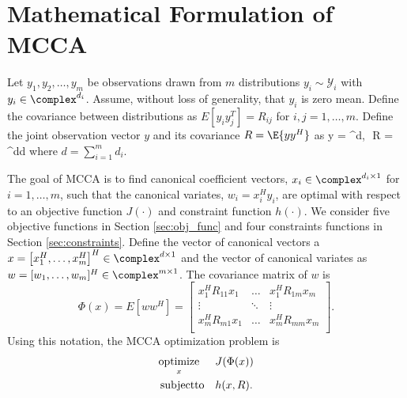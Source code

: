 \section{Mathematical Formulation of MCCA}

Let $y_1,y_2,\dots,y_m$ be observations drawn from $m$ distributions $y_i\sim
\mathcal{Y}_i$ with $y_i\in\complex^{d_i}$. Assume, without loss of generality, that $y_i$
is zero mean. Define the covariance between distributions as $E[y_iy_j^T]=R_{ij}$ for
$i,j=1,\dots,m$. Define the joint observation vector $y$ and its covariance $R=\E{yy^H}$ as
\be
y =  \in\complex^{d},\,\,\,\,R
= \in\complex^{d\times d}
\ee
where $d=\sum_{i=1}^md_i$.

The goal of MCCA is to find canonical coefficient vectors, $x_i\in\complex^{d_i\times 1}$
for $i=1,\dots,m$, such that the canonical variates, $w_i=x_i^Hy_i$, are optimal with
respect to an objective function $J(\cdot)$ and constraint function $h(\cdot)$. We
consider five objective functions \cite{kettenring1971canonical} in Section
\ref{sec:obj_func} and four constraints functions \cite{nielsen1994analysis} in Section
\ref{sec:constraints}. Define the vector of canonical vectors a
$x=\left[x_1^H,\dots,x_m^H\right]^H\in\complex^{d\times 1}$ and the vector of canonical
variates as $w=[w_1,\dots,w_m]^H\in\complex^{m\times 1}$. The covariance matrix of $w$ is
\begin{equation*}
\Phi(x)=E[ww^H]=\left[\begin{array}{ccc} x_1^HR_{11}x_1 & \dots & x_1^HR_{1m}x_m \\ \vdots
    & \ddots & \vdots \\ x_m^HR_{m1}x_1 & \dots & x_m^HR_{mm}x_m\\ \end{array}\right].
\end{equation*}
Using this notation, the MCCA optimization problem is
\begin{equation}\label{eq:opt_prob}
\begin{aligned}
&\underset{x}{\mathop{\rm optimize}} && J(\Phi(x))\\
&\mathop{\rm subject to} && h(x,R).\\
\end{aligned}
\end{equation}

